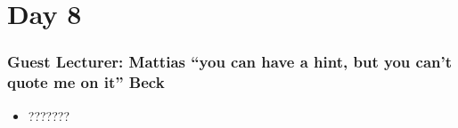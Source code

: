 \section{Day 8}
    \subsubsection{Guest Lecturer: Mattias ``you can have a hint, but you can't quote me on it'' Beck}
    \begin{itemize}
        \item ???????
    \end{itemize}
